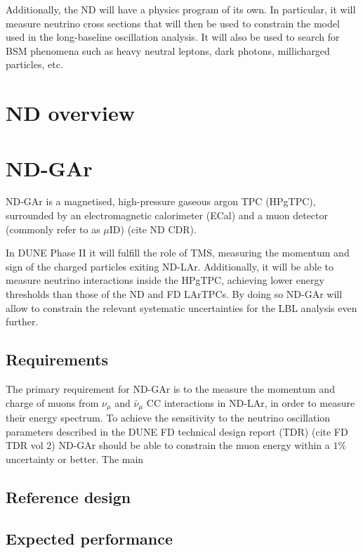 Additionally, the ND will have a physics program of its own. In particular, it will measure neutrino cross sections that will then be used to constrain the model used in the long-baseline oscillation analysis. It will also be used to search for BSM phenomena such as heavy neutral leptons, dark photons, millicharged particles, etc.

\section{ND overview}

\section{ND-GAr}

ND-GAr is a magnetised, high-pressure gaseous argon TPC (HPgTPC), surrounded by an electromagnetic calorimeter (ECal) and a muon detector (commonly refer to as $\mu$ID) (cite ND CDR).

In DUNE Phase II it will fulfill the role of TMS, measuring the momentum and sign of the charged particles exiting ND-LAr. Additionally, it will be able to measure neutrino interactions inside the HPgTPC, achieving lower energy thresholds than those of the ND and FD LArTPCs. By doing so ND-GAr will allow to constrain the relevant systematic uncertainties for the LBL analysis even further.

\subsection{Requirements}

The primary requirement for ND-GAr is to the measure the momentum and charge of muons from $\nu_{\mu}$ and $\bar{\nu}_{\mu}$ CC interactions in ND-LAr, in order to measure their energy spectrum. To achieve the sensitivity to the neutrino oscillation parameters described in the DUNE FD technical design report (TDR) (cite FD TDR vol 2) ND-GAr should be able to constrain the muon energy within a $1\%$ uncertainty or better. The main 

\subsection{Reference design}

\subsection{Expected performance}